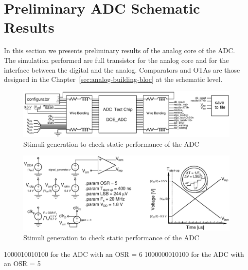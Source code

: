\clearpage
\section{Preliminary ADC Schematic Results}
In this section we presents preliminary results of the analog core of the ADC\@. The simulation performed are full transistor for the analog core and for the interface between the digital and the analog. Comparators and OTAs are those designed in the Chapter~\ref{sec:analog-building-bloc} at the schematic level.

\begin{figure}[htp]
    \centering
    \includegraphics[width=\textwidth]{Chapter5/Figs/adc_chip/tb_adc_full.ps}
    \caption{Stimuli generation to check static performance of the ADC}
    \label{fig:tb_adc_stimuli}
\end{figure}

\begin{figure}[htp]
    \centering
    \includegraphics[width=\textwidth]{Chapter5/Figs/adc_chip/input_signal_generator.ps}
    \caption{Stimuli generation to check static performance of the ADC}
    \label{fig:tb_adc_stimuli}
\end{figure}


1000010010100 for the ADC with an OSR = 6
1000000010100 for the ADC with an OSR = 5

